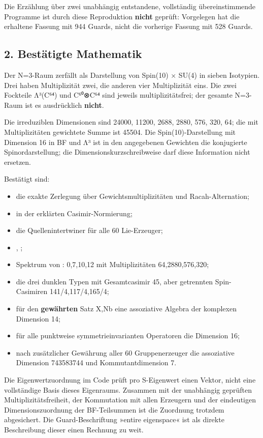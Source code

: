 Die Erzählung über zwei unabhängig entstandene, vollständig
übereinstimmende Programme ist durch diese Reproduktion \textbf{nicht}
geprüft: Vorgelegen hat die erhaltene Fassung mit 944 Guards, nicht die
vorherige Fassung mit 528 Guards.

\subsection{2. Bestätigte Mathematik}\label{bestuxe4tigte-mathematik}

Der N=3-Raum zerfällt als Darstellung von Spin(10) × SU(4) in sieben
Isotypien. Drei haben Multiplizität zwei, die anderen vier Multiplizität
eins. Die zwei Fockteile Λ³(C⁶⁴) und C⁶⁰⊗C⁶⁴ sind jeweils
multiplizitätsfrei; der gesamte N=3-Raum ist es ausdrücklich
\textbf{nicht}.

Die irreduziblen Dimensionen sind 24000, 11200, 2688, 2880, 576, 320,
64; die mit Multiplizitäten gewichtete Summe ist 45504. Die
Spin(10)-Darstellung mit Dimension 16 in BF und Λ³ ist in den
angegebenen Gewichten die konjugierte Spinordarstellung; die
Dimensionskurzschreibweise  darf diese Information nicht
ersetzen.

Bestätigt sind:

\begin{itemize}
\tightlist
\item
  die exakte Zerlegung über Gewichtsmultiplizitäten und
  Racah-Alternation;
\item
   in der erklärten Casimir-Normierung;
\item
  die Quellenintertwiner für alle 60 Lie-Erzeuger;
\item
  , ;
\item
  Spektrum von : 0,7,10,12 mit Multiplizitäten
  64,2880,576,320;
\item
  die drei dunklen Typen mit Gesamtcasimir 45, aber getrennten
  Spin-Casimiren 141/4,117/4,165/4;
\item
  für den \textbf{gewährten} Satz X,Nb eine assoziative Algebra der
  komplexen Dimension 14;
\item
  für alle punktweise symmetrieinvarianten Operatoren die Dimension 16;
\item
  nach zusätzlicher Gewährung aller 60 Gruppenerzeuger die assoziative
  Dimension 743583744 und Kommutantdimension 7.
\end{itemize}

Die Eigenwertzuordnung im Code prüft pro S-Eigenwert einen Vektor, nicht
eine vollständige Basis dieses Eigenraums. Zusammen mit der unabhängig
geprüften Multiplizitätsfreiheit, der Kommutation mit allen Erzeugern
und der eindeutigen Dimensionszuordnung der BF-Teilsummen ist die
Zuordnung trotzdem abgesichert. Die Guard-Beschriftung »entire
eigenspace« ist als direkte Beschreibung dieser einen Rechnung zu weit.


